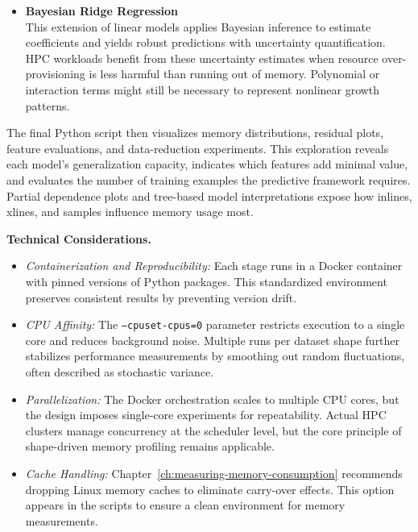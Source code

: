 \begin{itemize}
    \item \textbf{Bayesian Ridge Regression}~\cite{bishop2006pattern}\\
    This extension of linear models applies Bayesian inference to estimate coefficients and yields robust predictions with uncertainty quantification.
    HPC workloads benefit from these uncertainty estimates when resource over-provisioning is less harmful than running out of memory.
    Polynomial or interaction terms might still be necessary to represent nonlinear growth patterns.
\end{itemize}

The final Python script then visualizes memory distributions, residual plots, feature evaluations, and data-reduction experiments.
This exploration reveals each model's generalization capacity, indicates which features add minimal value, and evaluates the number of training examples the predictive framework requires.
Partial dependence plots and tree-based model interpretations expose how inlines, xlines, and samples influence memory usage most.

\vspace{1em}
\noindent
\textbf{Technical Considerations.}
\begin{itemize}
    \item \emph{Containerization and Reproducibility:}
    Each stage runs in a Docker container with pinned versions of Python packages.
    This standardized environment preserves consistent results by preventing version drift.
    \item \emph{\ac{CPU} Affinity:}
    The \texttt{--cpuset-cpus=0} parameter restricts execution to a single core and reduces background noise.
    Multiple runs per dataset shape further stabilizes performance measurements by smoothing out random fluctuations, often described as stochastic variance.
    \item \emph{Parallelization:}
    The Docker orchestration scales to multiple \ac{CPU} cores, but the design imposes single-core experiments for repeatability.
    Actual \ac{HPC} clusters manage concurrency at the scheduler level, but the core principle of shape-driven memory profiling remains applicable.
    \item \emph{Cache Handling:}
    Chapter~\ref{ch:measuring-memory-consumption} recommends dropping Linux memory caches to eliminate carry-over effects.
    This option appears in the scripts to ensure a clean environment for memory measurements.
\end{itemize}

